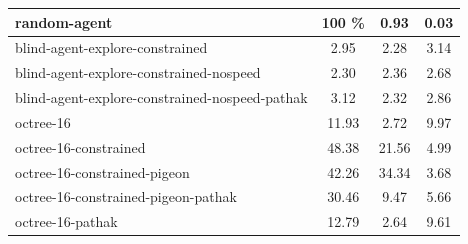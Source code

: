 \begin{longtable}{|l|c|c|c|}
    \\ \hline
    random-agent	&	100	\%	&	0.93	&	0.03	\\ \hline
blind-agent-explore-constrained & 2.95 & {\cellcolor[HTML]{EBF2F0}} \color[HTML]{000000} 2.28 & 3.14 \\ \hline
blind-agent-explore-constrained-nospeed & 2.30 & {\cellcolor[HTML]{EAF2F0}} \color[HTML]{000000} 2.36 & 2.68 \\ \hline
blind-agent-explore-constrained-nospeed-pathak & 3.12 & {\cellcolor[HTML]{EBF2F0}} \color[HTML]{000000} 2.32 & 2.86 \\ \hline
octree-16 & 11.93 & {\cellcolor[HTML]{E9F1EF}} \color[HTML]{000000} 2.72 & 9.97 \\ \hline
octree-16-constrained & 48.38 & {\cellcolor[HTML]{90C7BC}} \color[HTML]{000000} 21.56 & 4.99 \\ \hline
octree-16-constrained-pigeon & 42.26 & {\cellcolor[HTML]{55AA99}} \color[HTML]{000000} 34.34 & 3.68 \\ \hline
octree-16-constrained-pigeon-pathak & 30.46 & {\cellcolor[HTML]{C9E2DC}} \color[HTML]{000000} 9.47 & 5.66 \\ \hline
octree-16-pathak & 12.79 & {\cellcolor[HTML]{E9F1EF}} \color[HTML]{000000} 2.64 & 9.61 \\ \hline

\end{longtable}
